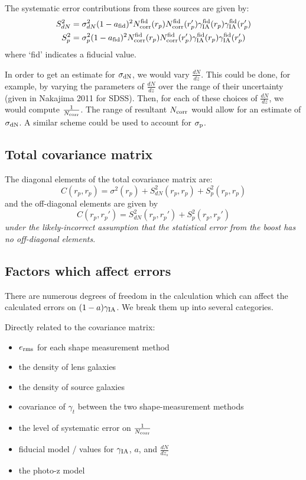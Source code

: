\documentclass[onecolumn,amsmath,aps,fleqn, superscriptaddress]{revtex4}
\begin{document}
The systematic error contributions from these sources are given by:
\begin{align}
S_{dN}^2 &= \sigma_{dN}^2 (1-a_{\rm fid})^2 N_{\rm corr}^{{\rm fid}}(r_p) N_{\rm corr}^{{\rm fid}}(r_p')\gamma_{\rm IA}^{\rm fid}(r_p) \gamma_{\rm IA}^{\rm fid}(r_p') \nonumber \\
S_{p}^2 &= \sigma_{p}^2 (1-a_{\rm fid})^2 N_{\rm corr}^{{\rm fid}}(r_p) N_{\rm corr}^{{\rm fid}}(r_p')\gamma_{\rm IA}^{\rm fid}(r_p) \gamma_{\rm IA}^{\rm fid}(r_p') 
\label{S2}
\end{align}
where `fid' indicates a fiducial value.

In order to get an estimate for $\sigma_{\rm dN}$, we would vary $\frac{dN}{dz}$. This could be done, for example, by varying the parameters of $\frac{dN}{dz}$ over the range of their uncertainty (given in Nakajima 2011 for SDSS). Then, for each of these choices of $\frac{dN}{dz}$, we would compute $\frac{1}{N_{\rm corr}}$. The range of resultant $N_{\rm corr}$ would allow for an estimate of $\sigma_{\rm dN}$. A similar scheme could be used to account for $\sigma_{\rm p}$.

\subsection*{Total covariance matrix}

The diagonal elements of the total covariance matrix are:
\begin{equation}
C(r_p,r_p) = \sigma^2(r_p) + S_{dN}^2(r_p, r_p) + S_{p}^2(r_p, r_p)
\label{diag}
\end{equation}
and the off-diagonal elements are given by
\begin{equation}
C(r_p, r_p') = S_{dN}^2(r_p,r_p')+S_{p}^2(r_p,r_p')
\label{off_diag}
\end{equation}
{\it under the likely-incorrect assumption that the statistical error from the boost has no off-diagonal elements}.

\subsection*{Factors which affect errors}
There are numerous degrees of freedom in the calculation which can affect the calculated errors on $(1-a)\gamma_{\rm IA}$. We break them up into several categories.

Directly related to the covariance matrix:
\begin{itemize}
\item{$e_{\rm rms}$ for each shape measurement method}
\item{the density of lens galaxies}
\item{the density of source galaxies}
\item{covariance of $\gamma_t$ between the two shape-measurement methods}
\item{the level of systematic error on $\frac{1}{N_{\rm corr}}$}
\item{fiducial model / values for $\gamma_{\rm IA}$, $a$, and $\frac{dN}{dz_s}$}
\item{the photo-z model}
\end{itemize}
\end{document}
